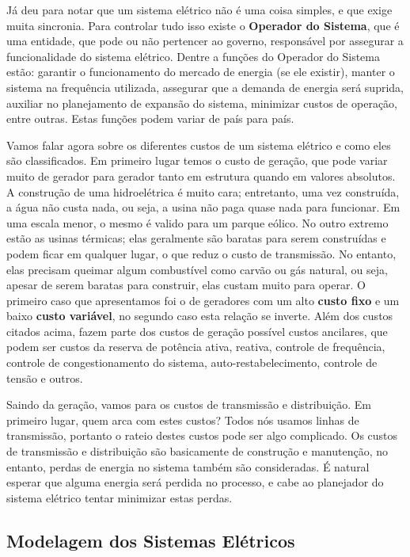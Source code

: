 Já deu para notar que um sistema elétrico não é uma coisa simples, e que exige muita sincronia. Para controlar tudo isso existe o \textbf{Operador do Sistema}, que é uma entidade, que pode ou não pertencer ao governo, responsável por assegurar a funcionalidade do sistema elétrico. Dentre a funções do Operador do Sistema estão: garantir o funcionamento do mercado de energia (se ele existir), manter o sistema na frequência utilizada, assegurar que a demanda de energia será suprida, auxiliar no planejamento de expansão do sistema, minimizar custos de operação, entre outras. Estas funções podem variar de país para país.

Vamos falar agora sobre os diferentes custos de um sistema elétrico e como eles são classificados. Em primeiro lugar temos o custo de geração, que pode variar muito de gerador para gerador tanto em estrutura quando em valores absolutos. A construção de uma hidroelétrica é muito cara; entretanto, uma vez construída, a água não custa nada, ou seja, a usina não paga quase nada para funcionar. Em uma escala menor, o mesmo é valido para um parque eólico. No outro extremo estão as usinas térmicas; elas geralmente são baratas para serem construídas e podem ficar em qualquer lugar, o que reduz o custo de transmissão. No entanto, elas precisam queimar algum combustível como carvão ou gás natural, ou seja, apesar de serem baratas para construir, elas custam muito para operar. O primeiro caso que apresentamos foi o de geradores com um alto \textbf{custo fixo} e um baixo \textbf{custo variável}, no segundo caso esta relação se inverte. Além dos custos citados acima, fazem parte dos custos de geração possível custos ancilares, que podem ser custos da reserva de potência ativa, reativa, controle de frequência, controle de congestionamento do sistema, auto-restabelecimento, controle de tensão e outros.

Saindo da geração, vamos para os custos de transmissão e distribuição. Em primeiro lugar, quem arca com estes custos? Todos nós usamos linhas de transmissão, portanto o rateio destes custos pode ser algo complicado. Os custos de transmissão e distribuição são basicamente de construção e manutenção, no entanto, perdas de energia no sistema também são consideradas. É natural esperar que alguma energia será perdida no processo, e cabe ao planejador do sistema elétrico tentar minimizar estas perdas. 



\subsection{Modelagem dos Sistemas Elétricos}

